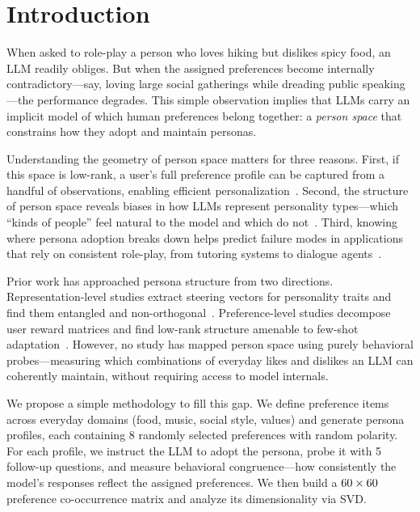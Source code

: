 \section{Introduction}
\label{sec:intro}

When asked to role-play a person who loves hiking but dislikes spicy food, an LLM readily obliges.
But when the assigned preferences become internally contradictory---say, loving large social gatherings while dreading public speaking---the performance degrades.
This simple observation implies that LLMs carry an implicit model of which human preferences belong together: a \emph{person space} that constrains how they adopt and maintain personas.

Understanding the geometry of person space matters for three reasons.
First, if this space is low-rank, a user's full preference profile can be captured from a handful of observations, enabling efficient personalization~\citep{bose2025lore, kobalczyk2024fewshot}.
Second, the structure of person space reveals biases in how LLMs represent personality types---which ``kinds of people'' feel natural to the model and which do not~\citep{zollo2024personalllm}.
Third, knowing where persona adoption breaks down helps predict failure modes in applications that rely on consistent role-play, from tutoring systems to dialogue agents~\citep{thakur2024personas}.

Prior work has approached persona structure from two directions.
Representation-level studies extract steering vectors for personality traits and find them entangled and non-orthogonal~\citep{chen2025persona, bhandari2026personality, feng2026persona}.
Preference-level studies decompose user reward matrices and find low-rank structure amenable to few-shot adaptation~\citep{bose2025lore, li2025alignx}.
However, no study has mapped person space using purely behavioral probes---measuring which combinations of everyday likes and dislikes an LLM can coherently maintain, without requiring access to model internals.

We propose a simple methodology to fill this gap.
We define \nprefs{} preference items across \ndomains{} everyday domains (\eg food, music, social style, values) and generate \nprofiles{} persona profiles, each containing 8 randomly selected preferences with random polarity.
For each profile, we instruct the LLM to adopt the persona, probe it with 5 follow-up questions, and measure behavioral congruence---how consistently the model's responses reflect the assigned preferences.
We then build a $60 \times 60$ preference co-occurrence matrix and analyze its dimensionality via SVD.


